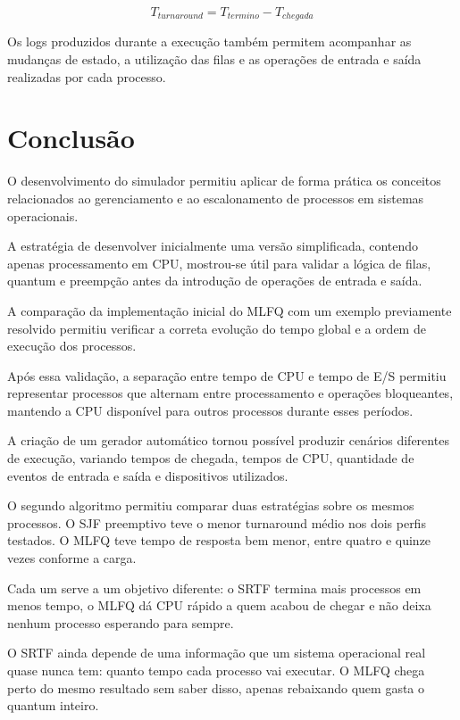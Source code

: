 \documentclass[12pt,a4paper]{article}
\begin{document}
\[
T_{turnaround}
=
T_{termino}
-
T_{chegada}
\]

Os logs produzidos durante a execução também permitem acompanhar as
mudanças de estado, a utilização das filas e as operações de entrada
e saída realizadas por cada processo.



\section{Conclusão}

O desenvolvimento do simulador permitiu aplicar de forma prática os
conceitos relacionados ao gerenciamento e ao escalonamento de
processos em sistemas operacionais.

A estratégia de desenvolver inicialmente uma versão simplificada,
contendo apenas processamento em CPU, mostrou-se útil para validar a
lógica de filas, quantum e preempção antes da introdução de operações
de entrada e saída.

A comparação da implementação inicial do MLFQ com um exemplo
previamente resolvido permitiu verificar a correta evolução do tempo
global e a ordem de execução dos processos.

Após essa validação, a separação entre tempo de CPU e tempo de E/S
permitiu representar processos que alternam entre processamento e
operações bloqueantes, mantendo a CPU disponível para outros processos
durante esses períodos.

A criação de um gerador automático tornou possível produzir cenários
diferentes de execução, variando tempos de chegada, tempos de CPU,
quantidade de eventos de entrada e saída e dispositivos utilizados.

O segundo algoritmo permitiu comparar duas estratégias sobre os
mesmos processos. O SJF preemptivo teve o menor turnaround médio nos
dois perfis testados. O MLFQ teve tempo de resposta bem menor, entre
quatro e quinze vezes conforme a carga.

Cada um serve a um objetivo diferente: o SRTF termina mais processos
em menos tempo, o MLFQ dá CPU rápido a quem acabou de chegar e não
deixa nenhum processo esperando para sempre.

O SRTF ainda depende de uma informação que um sistema operacional real
quase nunca tem: quanto tempo cada processo vai executar. O MLFQ chega
perto do mesmo resultado sem saber disso, apenas rebaixando quem gasta
o quantum inteiro.
\end{document}
